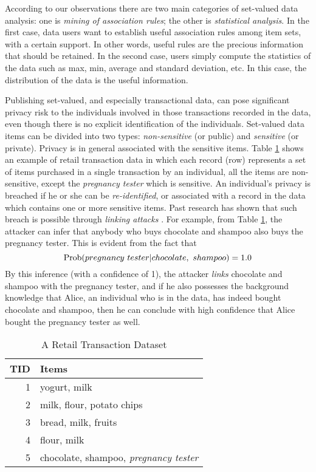 According to our observations there are two main categories of set-valued
data analysis: one is {\em mining of association rules}; the other is {\em
statistical analysis}. In the first case, data users want to establish useful
association rules among item sets, with a certain support. In other words,
useful rules are the precious information that should be retained. In the
second case, users simply compute the statistics of the data such as max,
min, average and standard deviation, etc. In this case, the distribution of
the data is the useful information.

Publishing set-valued, and especially transactional data,
can pose significant privacy risk to the
individuals involved in those transactions recorded in the data, even though
there is no explicit identification of the individuals.
Set-valued data items can be divided into two types:
{\em non-sensitive} (or public) and {\em sensitive} (or private).
Privacy is in general associated with the sensitive items.
Table \ref{tab:retail-ex} shows
an example of retail transaction data in which each record (row) represents
a set of items purchased in a single transaction by an individual, 
  all the items are non-sensitive, except the {\em pregnancy tester}
which is sensitive. An individual's privacy is breached if he or she can be
{\em re-identified}, or associated with a record in the data which contains
one or more sensitive items. Past research has shown that such breach is
possible through {\em linking attacks} \cite{FungWCY10:Survey}. For example,
from Table \ref{tab:retail-ex}, the attacker can infer that anybody who buys
chocolate and shampoo also buys the pregnancy tester.
This is evident from the fact that
\[{\rm Prob}(pregnancy~tester | chocolate,~ shampoo) = 1.0\]
By this inference (with a confidence of 1), the attacker {\em links}
chocolate and shampoo with the pregnancy tester, and if he also possesses the
background knowledge that Alice, an individual who is in the data, has indeed
bought chocolate and shampoo, then he can conclude with high confidence that
Alice bought the pregnancy tester as well.

\begin{table}[th]
\centering
\caption{A Retail Transaction Dataset}\label{tab:retail-ex}

\begin{tabular}{|r|l|} \hline
{\bf TID} & {\bf Items} \\ \hline \hline
1 & yogurt, milk \\ \hline
2 & milk, flour, potato chips \\ \hline
3 & bread, milk, fruits \\ \hline
4 & flour, milk \\ \hline
5 & chocolate, shampoo, {\em pregnancy tester} \\ \hline
\end{tabular}
\end{table}


